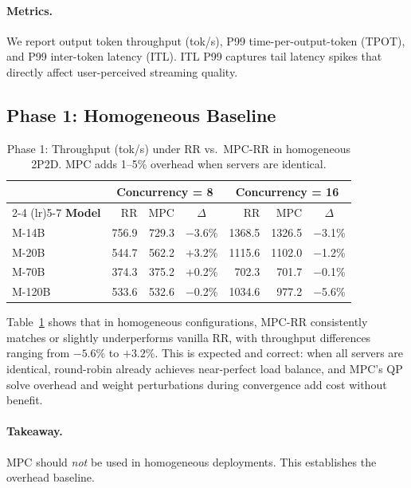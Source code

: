 \documentclass[runningheads]{llncs}
\begin{document}
\paragraph{Metrics.} We report output token throughput (tok/s), P99 time-per-output-token (TPOT), and P99 inter-token latency (ITL). ITL P99 captures tail latency spikes that directly affect user-perceived streaming quality.

\subsection{Phase 1: Homogeneous Baseline}
\label{sec:phase1}

\begin{table}[t]
\caption{Phase 1: Throughput (tok/s) under RR vs.\ MPC-RR in homogeneous 2P2D. MPC adds 1--5\% overhead when servers are identical.}
\label{tab:phase1}
\centering
\small
\setlength{\tabcolsep}{3.5pt}
\begin{tabular}{l rr c rr c}
\toprule
& \multicolumn{3}{c}{\textbf{Concurrency = 8}} & \multicolumn{3}{c}{\textbf{Concurrency = 16}} \\
\cmidrule(lr){2-4} \cmidrule(lr){5-7}
\textbf{Model} & RR & MPC & $\Delta$ & RR & MPC & $\Delta$ \\
\midrule
M-14B  & 756.9 & 729.3 & $-$3.6\% & 1368.5 & 1326.5 & $-$3.1\% \\
M-20B  & 544.7 & 562.2 & +3.2\% & 1115.6 & 1102.0 & $-$1.2\% \\
M-70B  & 374.3 & 375.2 & +0.2\% & 702.3 & 701.7 & $-$0.1\% \\
M-120B & 533.6 & 532.6 & $-$0.2\% & 1034.6 & 977.2 & $-$5.6\% \\
\bottomrule
\end{tabular}
\end{table}

Table~\ref{tab:phase1} shows that in homogeneous configurations, MPC-RR consistently matches or slightly underperforms vanilla RR, with throughput differences ranging from $-5.6$\% to $+3.2$\%. This is expected and correct: when all servers are identical, round-robin already achieves near-perfect load balance, and MPC's QP solve overhead and weight perturbations during convergence add cost without benefit.

\paragraph{Takeaway.} MPC should \textit{not} be used in homogeneous deployments. This establishes the overhead baseline.
\end{document}
